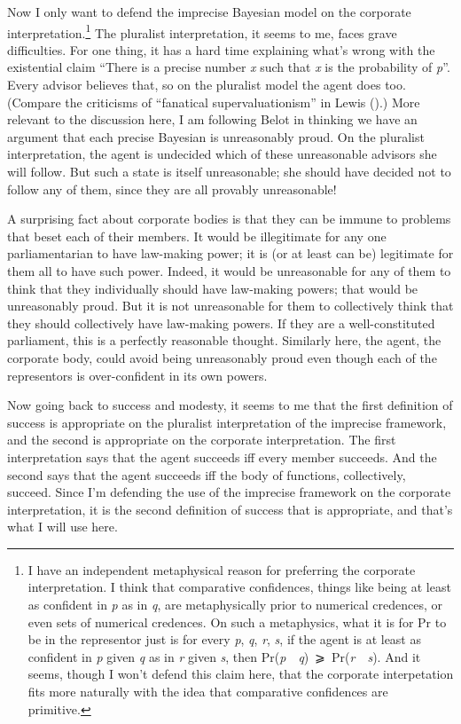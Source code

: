 \documentclass[
  10pt,
  letterpaper,
  DIV=11,
  numbers=noendperiod,
  twoside]{scrartcl}
\begin{document}
Now I only want to defend the imprecise Bayesian model on the corporate
interpretation.\footnote{I have an independent metaphysical reason for
  preferring the corporate interpretation. I think that comparative
  confidences, things like being at least as confident in \emph{p} as in
  \emph{q}, are metaphysically prior to numerical credences, or even
  sets of numerical credences. On such a metaphysics, what it is for Pr
  to be in the representor just is for every \emph{p}, \emph{q},
  \emph{r}, \emph{s}, if the agent is at least as confident in \emph{p}
  given \emph{q} as in \emph{r} given \emph{s}, then
  Pr(\emph{p}~\textbar~\emph{q})~⩾~Pr(\emph{r}~\textbar~\emph{s}). And
  it seems, though I won't defend this claim here, that the corporate
  interpetation fits more naturally with the idea that comparative
  confidences are primitive.} The pluralist interpretation, it seems to
me, faces grave difficulties. For one thing, it has a hard time
explaining what's wrong with the existential claim ``There is a precise
number \emph{x} such that \emph{x} is the probability of \emph{p}''.
Every advisor believes that, so on the pluralist model the agent does
too. (Compare the criticisms of ``fanatical supervaluationism'' in Lewis
().) More relevant to the discussion
here, I am following Belot in thinking we have an argument that each
precise Bayesian is unreasonably proud. On the pluralist interpretation,
the agent is undecided which of these unreasonable advisors she will
follow. But such a state is itself unreasonable; she should have decided
not to follow any of them, since they are all provably unreasonable!

A surprising fact about corporate bodies is that they can be immune to
problems that beset each of their members. It would be illegitimate for
any one parliamentarian to have law-making power; it is (or at least can
be) legitimate for them all to have such power. Indeed, it would be
unreasonable for any of them to think that they individually should have
law-making powers; that would be unreasonably proud. But it is not
unreasonable for them to collectively think that they should
collectively have law-making powers. If they are a well-constituted
parliament, this is a perfectly reasonable thought. Similarly here, the
agent, the corporate body, could avoid being unreasonably proud even
though each of the representors is over-confident in its own powers.

Now going back to success and modesty, it seems to me that the first
definition of success is appropriate on the pluralist interpretation of
the imprecise framework, and the second is appropriate on the corporate
interpretation. The first interpretation says that the agent succeeds
iff every member succeeds. And the second says that the agent succeeds
iff the body of functions, collectively, succeed. Since I'm defending
the use of the imprecise framework on the corporate interpretation, it
is the second definition of success that is appropriate, and that's what
I will use here.
\end{document}
